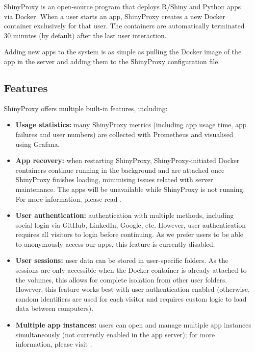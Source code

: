 ShinyProxy is an open-source program that deploys R/Shiny and Python apps via Docker. When a user starts an app, ShinyProxy creates a new Docker container exclusively for that user. The containers are automatically terminated 30 minutes (by default) after the last user interaction.

Adding new apps to the system is as simple as pulling the Docker image of the app in the server and adding them to the ShinyProxy configuration file.


\subsection{Features}

ShinyProxy offers multiple built-in features, including:

\begin{itemize}
	\item \textbf{Usage statistics:} many ShinyProxy metrics (including app usage time, app failures and user numbers) are collected with Prometheus and visualised using Grafana.
    \item \textbf{App recovery:} when restarting ShinyProxy, ShinyProxy-initiated Docker containers continue running in the background and are attached once ShinyProxy finishes loading, minimising issues related with server maintenance. The apps will be unavailable while ShinyProxy is not running. For more information, please read .
    \item \textbf{User authentication:} authentication with multiple methods, including social login via GitHub, LinkedIn, Google, etc. However, user authentication requires all visitors to login before continuing. As we prefer users to be able to anonymously access our apps, this feature is currently disabled.
    \item \textbf{User sessions:} user data can be stored in user-specific folders. As the sessions are only accessible when the Docker container is already attached to the volumes, this allows for complete isolation from other user folders. However, this feature works best with user authentication enabled (otherwise, random identifiers are used for each visitor and requires custom logic to load data between computers).
	\item \textbf{Multiple app instances:} users can open and manage multiple app instances simultaneously (not currently enabled in the app server); for more information, please visit .
\end{itemize}

